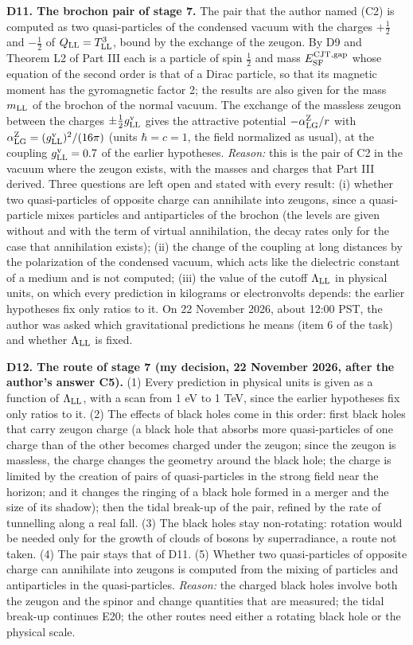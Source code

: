 \documentclass[
  10pt,
]{article}
\begin{document}
\textbf{D11. The brochon pair of stage 7.} The pair that the author
named (C2) is computed as two quasi-particles of the condensed vacuum
with the charges \(+\tfrac12\) and \(-\tfrac12\) of
\(Q_{\rm LL}=T^3_{\rm LL}\), bound by the exchange of the zeugon. By D9
and Theorem L2 of Part III each is a particle of spin \(\tfrac12\) and
mass \(E^{\rm CJT,gap}_{\rm SF}\) whose equation of the second order is
that of a Dirac particle, so that its magnetic moment has the
gyromagnetic factor 2; the results are also given for the mass
\(m_{\rm LL}\) of the brochon of the normal vacuum. The exchange of the
massless zeugon between the charges \(\pm\tfrac12g^{\rm v}_{\rm LL}\)
gives the attractive potential \(-\alpha^{\rm Z}_{\rm LG}/r\) with
\(\alpha^{\rm Z}_{\rm LG}=(g^{\rm v}_{\rm LL})^2/(16\pi)\) (units
\(\hbar=c=1\), the field normalized as usual), at the coupling
\(g^{\rm v}_{\rm LL}=0.7\) of the earlier hypotheses. \emph{Reason:}
this is the pair of C2 in the vacuum where the zeugon exists, with the
masses and charges that Part III derived. Three questions are left open
and stated with every result: (i) whether two quasi-particles of
opposite charge can annihilate into zeugons, since a quasi-particle
mixes particles and antiparticles of the brochon (the levels are given
without and with the term of virtual annihilation, the decay rates only
for the case that annihilation exists); (ii) the change of the coupling
at long distances by the polarization of the condensed vacuum, which
acts like the dielectric constant of a medium and is not computed; (iii)
the value of the cutoff \(\Lambda_{\rm LL}\) in physical units, on which
every prediction in kilograms or electronvolts depends: the earlier
hypotheses fix only ratios to it. On 22 November 2026, about 12:00 PST,
the author was asked which gravitational predictions he means (item 6 of
the task) and whether \(\Lambda_{\rm LL}\) is fixed.

\textbf{D12. The route of stage 7 (my decision, 22 November 2026, after
the author's answer C5).} (1) Every prediction in physical units is
given as a function of \(\Lambda_{\rm LL}\), with a scan from 1 eV to 1
TeV, since the earlier hypotheses fix only ratios to it. (2) The effects
of black holes come in this order: first black holes that carry zeugon
charge (a black hole that absorbs more quasi-particles of one charge
than of the other becomes charged under the zeugon; since the zeugon is
massless, the charge changes the geometry around the black hole; the
charge is limited by the creation of pairs of quasi-particles in the
strong field near the horizon; and it changes the ringing of a black
hole formed in a merger and the size of its shadow); then the tidal
break-up of the pair, refined by the rate of tunnelling along a real
fall. (3) The black holes stay non-rotating: rotation would be needed
only for the growth of clouds of bosons by superradiance, a route not
taken. (4) The pair stays that of D11. (5) Whether two quasi-particles
of opposite charge can annihilate into zeugons is computed from the
mixing of particles and antiparticles in the quasi-particles.
\emph{Reason:} the charged black holes involve both the zeugon and the
spinor and change quantities that are measured; the tidal break-up
continues E20; the other routes need either a rotating black hole or the
physical scale.
\end{document}
